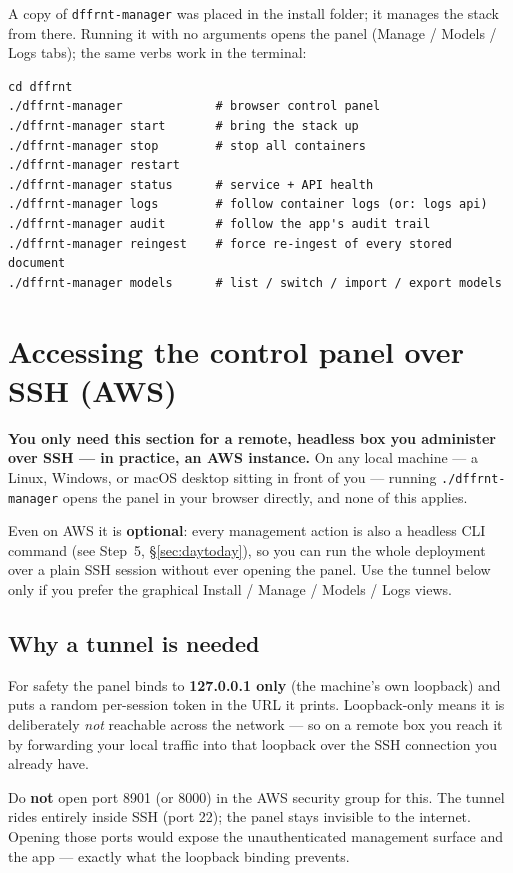 \documentclass[11pt,letterpaper]{article}
\let\oldsection\section
\renewcommand{\section}{\vspace{1em}\oldsection}
\begin{document}
A copy of \texttt{dffrnt-manager} was placed in the install folder; it
manages the stack from there. Running it with no arguments opens the panel
(Manage / Models / Logs tabs); the same verbs work in the terminal:

\begin{lstlisting}
cd dffrnt
./dffrnt-manager             # browser control panel
./dffrnt-manager start       # bring the stack up
./dffrnt-manager stop        # stop all containers
./dffrnt-manager restart
./dffrnt-manager status      # service + API health
./dffrnt-manager logs        # follow container logs (or: logs api)
./dffrnt-manager audit       # follow the app's audit trail
./dffrnt-manager reingest    # force re-ingest of every stored document
./dffrnt-manager models      # list / switch / import / export models
\end{lstlisting}

\section{Accessing the control panel over SSH (AWS)}

\textbf{You only need this section for a remote, headless box you administer
over SSH --- in practice, an AWS instance.} On any local machine --- a Linux,
Windows, or macOS desktop sitting in front of you --- running
\texttt{./dffrnt-manager} opens the panel in your browser directly, and none
of this applies.

Even on AWS it is \textbf{optional}: every management action is also a
headless CLI command (see Step~5, \S\ref{sec:daytoday}), so you can run the
whole deployment over a plain SSH session without ever opening the panel. Use
the tunnel below only if you prefer the graphical Install / Manage / Models /
Logs views.

\subsection{Why a tunnel is needed}

For safety the panel binds to \textbf{127.0.0.1 only} (the machine's own
loopback) and puts a random per-session token in the URL it prints.
Loopback-only means it is deliberately \emph{not} reachable across the network
--- so on a remote box you reach it by forwarding your local traffic into that
loopback over the SSH connection you already have.

\begin{gwarn}
Do \textbf{not} open port 8901 (or 8000) in the AWS security group for this.
The tunnel rides entirely inside SSH (port 22); the panel stays invisible to
the internet. Opening those ports would expose the unauthenticated management
surface and the app --- exactly what the loopback binding prevents.
\end{gwarn}
\end{document}
